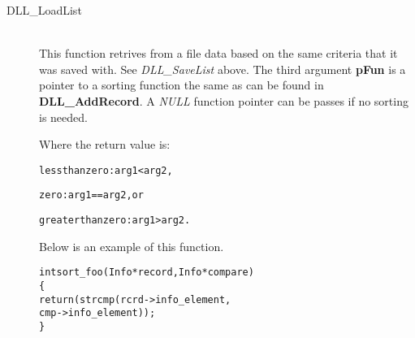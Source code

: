 \documentclass[10pt,letterpaper,titlepage]{article}
\begin{document}
\begin{description}
\begin{description}
 \item[DLL\_LoadList]\quad\\
 This function retrives from a file data based on the same criteria that it was saved with.  See \emph{DLL\_SaveList} above.  The third argument \textbf{pFun} is a pointer to a sorting function the same as can be found in \textbf{DLL\_AddRecord}.  A \emph{NULL} function pointer can be passes if no sorting is needed.
 \vspace{8pt}

 Where the return value is:
 \begin{alltt}
   less than zero:     arg1 < arg2,

   zero:               arg1 == arg2, or

   greater than zero:  arg1 > arg2.
 \end{alltt}

 Below is an example of this function.

 \begin{alltt}
   int sort_foo(Info *record, Info *compare)
      \{
      return(strcmp(rcrd->info_element,
                    cmp->info_element));
      \}

 \end{alltt}
 
 \end{description}




\end{description}
\end{document}
